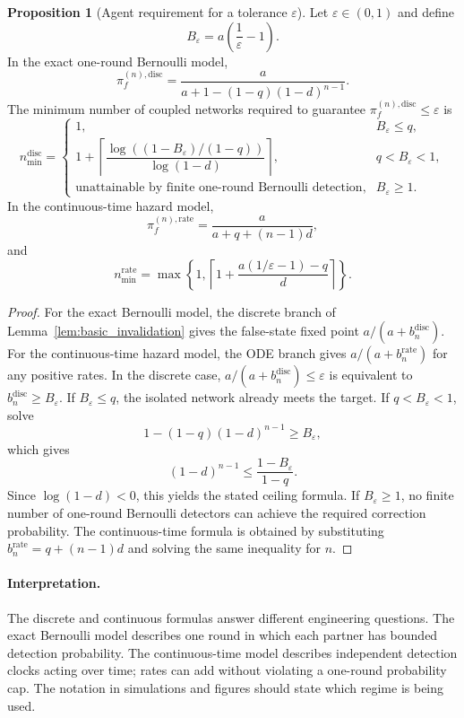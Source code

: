 \documentclass[12pt]{article}
\theoremstyle{definition}
\newtheorem{proposition}{Proposition}[section]
\begin{document}
\begin{proposition}[Agent requirement for a tolerance $\varepsilon$]
\label{prop:n_agents}
Let $\varepsilon\in(0,1)$ and define
\[
    B_\varepsilon=a\left(\frac1\varepsilon-1\right).
\]
In the exact one-round Bernoulli model,
\[
    \pi_f^{(n),\mathrm{disc}}
    =
    \frac{a}{a+1-(1-q)(1-d)^{n-1}}.
\]
The minimum number of coupled networks required to guarantee
$\pi_f^{(n),\mathrm{disc}}\le\varepsilon$ is
\[
 n_{\min}^{\mathrm{disc}}
 =
 \begin{cases}
 1, & B_\varepsilon\le q,\\[4pt]
 1+\left\lceil
 \dfrac{\log\left((1-B_\varepsilon)/(1-q)\right)}{\log(1-d)}
 \right\rceil,
 & q<B_\varepsilon<1,\\[12pt]
 \text{unattainable by finite one-round Bernoulli detection}, & B_\varepsilon\ge1.
 \end{cases}
\]
In the continuous-time hazard model,
\[
    \pi_f^{(n),\mathrm{rate}}
    =
    \frac{a}{a+q+(n-1)d},
\]
and
\[
    n_{\min}^{\mathrm{rate}}
    =
    \max\left\{1,
    \left\lceil
    1+\frac{a(1/\varepsilon-1)-q}{d}
    \right\rceil
    \right\}.
\]
\end{proposition}

\begin{proof}
For the exact Bernoulli model, the discrete branch of Lemma~\ref{lem:basic_invalidation} gives the false-state fixed point $a/(a+b_n^{\mathrm{disc}})$.  For the continuous-time hazard model, the ODE branch gives $a/(a+b_n^{\mathrm{rate}})$ for any positive rates.  In the discrete
case, $a/(a+b_n^{\mathrm{disc}})\le\varepsilon$ is equivalent to
$b_n^{\mathrm{disc}}\ge B_\varepsilon$.  If $B_\varepsilon\le q$, the isolated
network already meets the target.  If $q<B_\varepsilon<1$, solve
\[
1-(1-q)(1-d)^{n-1}\ge B_\varepsilon,
\]
which gives
\[
(1-d)^{n-1}\le\frac{1-B_\varepsilon}{1-q}.
\]
Since $\log(1-d)<0$, this yields the stated ceiling formula.  If
$B_\varepsilon\ge1$, no finite number of one-round Bernoulli detectors can
achieve the required correction probability.  The continuous-time formula is
obtained by substituting $b_n^{\mathrm{rate}}=q+(n-1)d$ and solving the same
inequality for $n$.
\end{proof}

\paragraph{Interpretation.}
The discrete and continuous formulas answer different engineering questions.
The exact Bernoulli model describes one round in which each partner has bounded
detection probability.  The continuous-time model describes independent
detection clocks acting over time; rates can add without violating a one-round
probability cap.  The notation in simulations and figures should state which
regime is being used.
\end{document}
